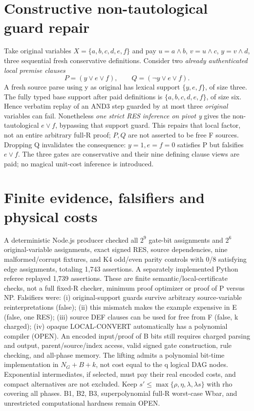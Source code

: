 \documentclass[11pt]{article}
\begin{document}
\section*{Constructive non-tautological guard repair}
Take original variables $X=\{a,b,c,d,e,f\}$ and pay $u=a\land b$, $v=u\land c$, $y=v\land d$, three sequential fresh conservative definitions. Consider two \emph{already authenticated local premise clauses}
\[
P=(y\lor e\lor f),\qquad Q=(\neg y\lor e\lor f).
\]
A fresh source parse using y as original has lexical support $\{y,e,f\}$, of size three. The fully typed base support after paid definitions is $\{a,b,c,d,e,f\}$, of size six. Hence verbatim replay of an AND3 step guarded by at most three \emph{original} variables can fail. Nonetheless \emph{one strict RES inference on pivot y} gives the non-tautological $e\lor f$, bypassing that support guard. This repairs that local factor, not an entire arbitrary full-R proof; $P,Q$ are not asserted to be free F sources. Dropping Q invalidates the consequence: $y=1,e=f=0$ satisfies P but falsifies $e\lor f$. The three gates are conservative and their nine defining clause views are paid; no magical unit-cost inference is introduced.

\section*{Finite evidence, falsifiers and physical costs}
A deterministic Node.js producer checked all $2^9$ gate-bit assignments and $2^6$ original-variable assignments, exact signed RES, source dependencies, nine malformed/corrupt fixtures, and K4 odd/even parity controls with 0/8 satisfying edge assignments, totaling 1,743 assertions. A separately implemented Python referee replayed 1,739 assertions. These are finite semantic/local-certificate checks, not a full fixed-R checker, minimum proof optimizer or proof of P versus NP. Falsifiers were: (i) original-support guards survive arbitrary source-variable reinterpretations (false); (ii) this mismatch makes the example expensive in E (false, one RES); (iii) source DEF clauses can be used for free from F (false, k charged); (iv) opaque LOCAL-CONVERT automatically has a polynomial compiler (OPEN). An encoded input/proof of B bits still requires charged parsing and output, parent/source/index access, valid signed gate construction, rule checking, and all-phase memory. The lifting admits a polynomial bit-time implementation in $N_G+B+k$, not cost equal to the q logical DAG nodes. Exponential intermediates, if selected, must pay their real encoded costs, and compact alternatives are not excluded. Keep $s'\le\max\{\rho,\eta,\lambda,\lambda s\}$ with rho covering all phases. B1, B2, B3, superpolynomial full-R worst-case Wbar, and unrestricted computational hardness remain OPEN.
\end{document}
